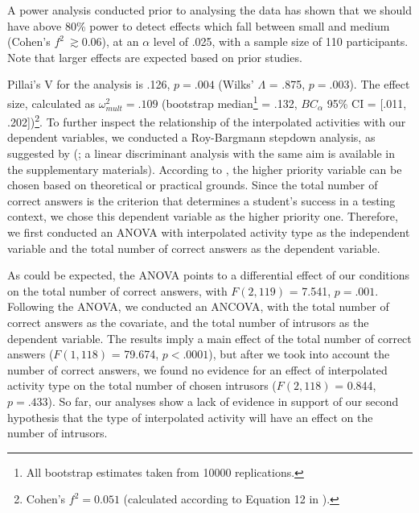A power analysis conducted prior to analysing the data
\citep[using the G*Power software by][]{faulStatisticalPowerAnalyses2009}
has shown that we should have above 80\% power to detect effects which
fall between small and medium (Cohen's \(f^2\ \gtrsim 0.06\)), at an
\(\alpha\) level of .025, with a sample size of 110 participants. Note
that larger effects are expected based on prior studies.

Pillai's V for the analysis is .126, \(p = .004\) (Wilks' \(\Lambda\) =
.875, \(p = .003\)). The effect size, calculated as
\(\omega^2_{mult} = .109\) (bootstrap
median\footnote{All bootstrap estimates taken from 10000 replications.}
= .132, \(BC_\alpha\) 95\% CI = {[}.011, .202{]})\footnote{
Cohen's \(f^2 = 0.051\) (calculated according to Equation 12 in
\citealp{steynjrEstimatingEffectSize2009}).
}. To further inspect the relationship of the interpolated activities
with our dependent variables, we conducted a Roy-Bargmann stepdown
analysis, as suggested by
\citeauthor{tabachnickUsingMultivariateStatistics2012}
(\citeyear{tabachnickUsingMultivariateStatistics2012}; a linear
discriminant analysis with the same aim is available in the
supplementary materials). According to
\citet{tabachnickUsingMultivariateStatistics2012}, the higher priority
variable can be chosen based on theoretical or practical grounds. Since
the total number of correct answers is the criterion that determines a
student's success in a testing context, we chose this dependent variable
as the higher priority one. Therefore, we first conducted an ANOVA with
interpolated activity type as the independent variable and the total
number of correct answers as the dependent variable.

As could be expected, the ANOVA points to a differential effect of our
conditions on the total number of correct answers, with \(F(2, 119)\) =
7.541, \(p = .001\). Following the ANOVA, we conducted an ANCOVA, with
the total number of correct answers as the covariate, and the total
number of intrusors as the dependent variable. The results imply a main
effect of the total number of correct answers (\(F(1, 118)\) = 79.674,
\(p < .0001\)), but after we took into account the number of correct
answers, we found no evidence for an effect of interpolated activity
type on the total number of chosen intrusors (\(F (2, 118)\) = 0.844,
\(p = .433\)). So far, our analyses show a lack of evidence in support
of our second hypothesis that the type of interpolated activity will
have an effect on the number of intrusors.

